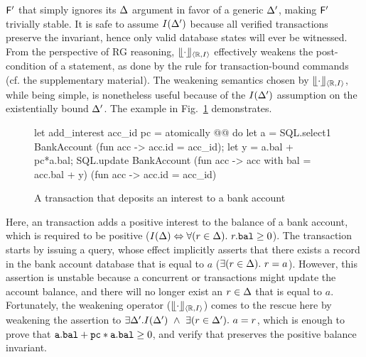 ${\sf F}'$ that simply ignores its $\Delta$ argument in favor of a generic
$\Delta'$, making ${\sf F}'$ trivially stable. It is safe to assume
$I(\Delta')$ because all verified transactions preserve the invariant,
hence only valid database states will ever be witnessed. From the
perspective of RG reasoning, $\llfloor \cdot \rrfloor_{\langle \mathbb{R},I \rangle}$ effectively weakens
the post-condition of a statement, as done by the
 rule for transaction-bound commands (cf.  the
supplementary material). The weakening semantics chosen by
$\llfloor \cdot \rrfloor_{\langle \mathbb{R},I \rangle}$, while being simple, is nonetheless useful because
of the $I(\Delta')$ assumption on the existentially bound $\Delta'$. The
example in Fig.~\ref{fig:weakening-example} demonstrates. 
\begin{figure}[h]
\begin{ocaml}
let add_interest acc_id pc = atomically @@ do
  let a = SQL.select1 BankAccount (fun acc -> acc.id = acc_id);
  let y = a.bal + pc*a.bal;
  SQL.update BankAccount (fun acc -> {acc with bal = acc.bal + y})
                         (fun acc -> acc.id = acc_id)
\end{ocaml}
\caption{A transaction that deposits an interest to a bank account}
\label{fig:weakening-example}
\end{figure}
Here, an  transaction adds a positive interest to the
balance of a bank account, which is required to be positive ($I(\Delta)
\Leftrightarrow \forall(r\in\Delta).~r.{\tt bal}\ge 0$). The transaction
starts by issuing a  query, whose effect implicitly asserts
that there exists a record in the bank account database that is equal
to $a$ ($\exists(r\in\Delta).~r=a$). However, this assertion is unstable
because a concurrent  or  transactions might
update the account balance, and there will no longer exist an
$r\in\Delta$ that is equal to $a$. Fortunately, the weakening operator
($\llfloor \cdot \rrfloor_{\langle \mathbb{R},I \rangle}$) comes to the rescue here by weakening the
assertion to $\exists \Delta'.I(\Delta') ~\wedge~ \exists(r\in\Delta').~a=r$,
which is enough to prove that ${\tt a.bal + pc*a.bal}\ge 0$, and verify
that  preserves the positive balance invariant.

